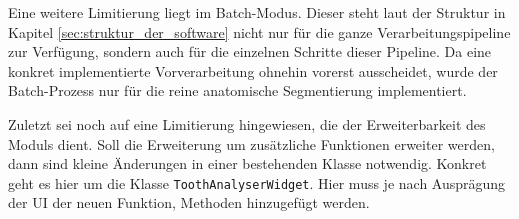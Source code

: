 Eine weitere Limitierung liegt im Batch-Modus. Dieser steht laut der Struktur in
Kapitel \ref{sec:struktur_der_software} nicht nur für die ganze Verarbeitungspipeline
zur Verfügung, sondern auch für die einzelnen Schritte dieser Pipeline. Da eine konkret
implementierte Vorverarbeitung ohnehin vorerst ausscheidet, wurde der Batch-Prozess
nur für die reine anatomische Segmentierung implementiert.

Zuletzt sei noch auf eine Limitierung hingewiesen, die der Erweiterbarkeit des Moduls
dient. Soll die Erweiterung um zusätzliche Funktionen erweiter werden, dann sind
kleine Änderungen in einer bestehenden Klasse notwendig. Konkret geht es hier um
die Klasse \texttt{ToothAnalyserWidget}. Hier muss je nach Ausprägung der \ac{UI}
der neuen Funktion, Methoden hinzugefügt werden.
